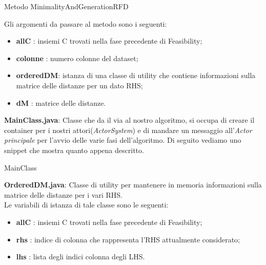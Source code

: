 \begin{listing}[H]
	\caption{Metodo MinimalityAndGenerationRFD}
	\label{Code:6}
\end{listing}
Gli argomenti da passare al metodo sono i seguenti:
\begin{itemize}
	\item \textbf{allC} : insiemi C trovati nella fase precedente di Feasibility;
	\item \textbf{colonne} : numero colonne del dataset;
	\item \textbf{orderedDM}:  istanza di una classe di utility che contiene informazioni sulla matrice delle distanze per un dato RHS;
	\item \textbf{dM} : matrice delle distanze.
\end{itemize}
\textbf{MainClass.java}:
Classe che da il via al nostro algoritmo, si occupa di creare il container per i nostri attori(\emph{ActorSystem}) e di mandare un messaggio all'\emph{Actor principale} per l'avvio delle varie fasi dell'algoritmo.
Di seguito vediamo uno snippet che mostra quanto appena descritto.
\begin{listing}[H]
	\caption{MainClass}
	\label{Code:7}
\end{listing}
\textbf{OrderedDM.java}:
Classe di utility per mantenere in memoria informazioni sulla matrice delle distanze per i vari RHS.\\
Le variabili di istanza di tale classe sono le seguenti:
\begin{itemize}
	\item \textbf{allC} : insiemi C trovati nella fase precedente di Feasibility;
	\item \textbf{rhs} : indice di colonna che rappresenta l'RHS attualmente considerato;
	\item \textbf{lhs} : lista degli indici colonna degli LHS.
\end{itemize}
